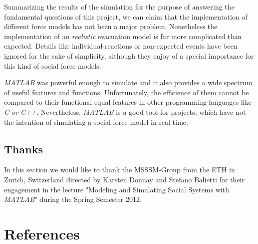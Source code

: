 \documentclass[11pt]{article}
\begin{document}
Summarizing the results of the simulation for the purpose of answering the fundamental questions 
of this project, we can claim that the implementation of different force models
has not  been a major problem. Nonetheless the implementation
of an \textit{realistic} evacuation model is far more complicated than expected.
Details like individual-reactions or non-expected events have been 
ignored for the sake of simplicity, although they enjoy of a special importance
for this kind of social force models.

\textit{MATLAB} was powerful enough to simulate and it also provides a wide spectrum of useful features and functions.
Unfortunately, the efficience of them cannot be compared to their functional equal features in 
other programming languages like \textit{C or C++}. Nevertheless, \textit{MATLAB} is a good tool
for projects, which have not the intention of simulating a social force model in
real time.

\subsection{Thanks}

In this section we would like to thank the MSSSM-Group from the ETH in Zurich, Switzerland
directed by Karsten Donnay and Stefano Balietti for their engagement in the lecture
"Modeling and Simulating Social Systems with \textit{MATLAB}" during the Spring Semester 2012.

\section{References}
\end{document}

